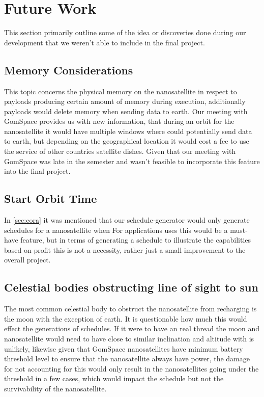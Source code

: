 \section{Future Work} \label{sec:future}
This section primarily outline some of the idea or discoveries done during our development that we weren't able to include in the final project. 

\subsection*{Memory Considerations}
This topic concerns the physical memory on the nanosatellite in respect to payloads producing certain amount of memory during execution, additionally payloads would delete memory when sending data to earth. Our meeting with GomSpace provides us with new information, that during an orbit for the nanosatellite it would have multiple windows where could potentially send data to earth, but depending on the geographical location it would cost a fee to use the service of other countries satellite dishes. Given that our meeting with GomSpace was late in the semester and wasn't feasible to incorporate this feature into the final project.

\subsection*{Start Orbit Time}
In \cref{sec:cora} it was mentioned that our schedule-generator would only generate schedules for a nanosatellite when 
For applications uses this would be a must-have feature, but in terms of generating a schedule to illustrate the capabilities based on profit this is not a necessity, rather just a small improvement to the overall project.

\subsection*{Celestial bodies obstructing line of sight to sun}
The most common celestial body to obstruct the nanosatellite from recharging is the moon with the exception of earth. 
It is questionable how much this would effect the generations of schedules. If it were to have an real thread the moon and nanosatellite would need to have close to similar inclination and altitude with is unlikely, likewise given that GomSpace nanosatellites have minimum battery threshold level to ensure that the nanosatellite always have power, the damage for not accounting for this would only result in the nanosatellites going under the threshold in a few cases, which would impact the schedule but not the survivability of the nanosatellite.

